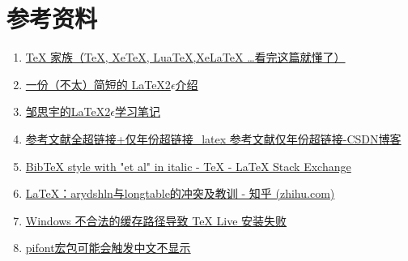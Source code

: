 \chapter*{参考资料}\label{chap:refinfor}
\begin{enumerate}[itemsep=1.5ex]
    \item \href{https://zhuanlan.zhihu.com/p/248669482}{TeX 家族（TeX, XeTeX, LuaTeX,XeLaTeX …看完这篇就懂了）}
    \item \href{http://mirrors.ctan.org/info/lshort/chinese/lshort-zh-cn.pdf}{一份（不太）简短的 \LaTeX{}2$\epsilon$介绍}
    \item \href{https://github.com/zousiyu1995/Study-LaTeX}{邹思宇的\LaTeX{}2$\epsilon$学习笔记}
    \item \href{https://blog.csdn.net/qq_36829039/article/details/123576507}{参考文献全超链接+仅年份超链接\_latex 参考文献仅年份超链接-CSDN博客}
    \item \href{https://tex.stackexchange.com/questions/532367/bibtex-style-with-et-al-in-italic}{BibTeX style with "et al" in italic - TeX - LaTeX Stack Exchange}
    \item \href{https://zhuanlan.zhihu.com/p/667681242}{LaTeX：arydshln与longtable的冲突及教训 - 知乎 (zhihu.com)}
    \item \href{https://syvshc.github.io/2021-04-07-illegal-temp-cause-tlinstall-failure/}{Windows 不合法的缓存路径导致 TeX Live 安装失败}
    \item \href{https://github.com/CTeX-org/ctex-kit/issues/688}{pifont宏包可能会触发中文不显示}
\end{enumerate}